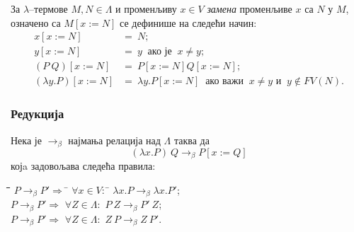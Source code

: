 \begin{definition}
За $\lambda$--термове $M, N \in \Lambda$ и променљиву $x \in V$
\emph{замена} променљиве $x$ са $N$ у $M$, означено са $M[x := N]$ се
дефинише на следећи начин:
\begin{align*}
x[x := N] &=\ N; \\
y[x := N] &=\ y\ \text{ ако је }\ x \neq y; \\
(P\ Q)[x := N] &=\ P[x := N]Q[x := N]; \\
(\lambda y. P)[x := N] &=\ \lambda y. P[x := N]\ \text{ ако важи }\ x \neq y \text{ и }\ y \notin FV(N). 
\end{align*}
\end{definition}

\subsubsection{Редукција}

\begin{definition}
Нека је $\rightarrow_{\beta}$ најмања релација над $\Lambda$ таква да
$$(\lambda x. P)\ Q \rightarrow_{\beta} P[x := Q]$$
којa задовољава следећа правила:
\begin{center}
\begin{tabbing}
\hspace{5mm}\=\hspace{5mm}\=\hspace{5mm}\=\hspace{5mm}\=\hspace{5mm}\=\kill
\>\> $P \rightarrow_{\beta} P' \Rightarrow$ \= $\forall x \in V :$ \= $\lambda x. P \rightarrow_{\beta} \lambda x. P'$;\\ 
\>\> $P \rightarrow_{\beta} P' \Rightarrow$ \> $\forall Z \in \Lambda :$ \> $P\ Z \rightarrow_{\beta} P'\ Z$; \\
\>\> $P \rightarrow_{\beta} P' \Rightarrow$ \> $\forall Z \in \Lambda :$ \> $Z\ P \rightarrow_{\beta} Z\ P'$.
\end{tabbing}
\end{center}
\end{definition}

